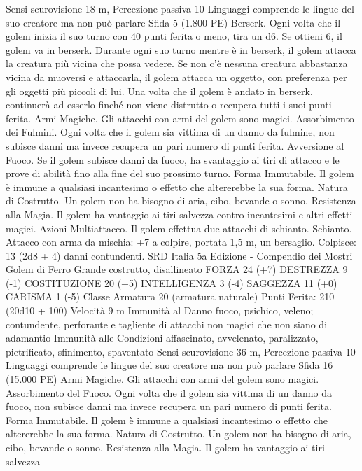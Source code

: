 \begin{multicols}{2}
Sensi scurovisione 18 m, Percezione passiva 10
Linguaggi comprende le lingue del suo creatore ma non può
parlare
Sfida 5 (1.800 PE)
Berserk. Ogni volta che il golem inizia il suo turno con 40 punti
ferita o meno, tira un d6. Se ottieni 6, il golem va in berserk.
Durante ogni suo turno mentre è in berserk, il golem attacca la
creatura più vicina che possa vedere. Se non c’è nessuna creatura
abbastanza vicina da muoversi e attaccarla, il golem attacca un
oggetto, con preferenza per gli oggetti più piccoli di lui. Una
volta che il golem è andato in berserk, continuerà ad esserlo
finché non viene distrutto o recupera tutti i suoi punti ferita.
Armi Magiche. Gli attacchi con armi del golem sono magici.
Assorbimento dei Fulmini. Ogni volta che il golem sia vittima di
un danno da fulmine, non subisce danni ma invece recupera un
pari numero di punti ferita.
Avversione al Fuoco. Se il golem subisce danni da fuoco, ha
svantaggio ai tiri di attacco e le prove di abilità fino alla fine del
suo prossimo turno.
Forma Immutabile. Il golem è immune a qualsiasi incantesimo o
effetto che altererebbe la sua forma.
Natura di Costrutto. Un golem non ha bisogno di aria, cibo,
bevande o sonno.
Resistenza alla Magia. Il golem ha vantaggio ai tiri salvezza
contro incantesimi e altri effetti magici.
Azioni
Multiattacco. Il golem effettua due attacchi di schianto.
Schianto. Attacco con arma da mischia: +7 a colpire, portata 1,5
m, un bersaglio.
Colpisce: 13 (2d8 + 4) danni contundenti.
SRD Italia 5a Edizione - Compendio dei Mostri
Golem di Ferro
Grande costrutto, disallineato
FORZA 24 (+7)
DESTREZZA 9 (-1)
COSTITUZIONE 20 (+5)
INTELLIGENZA 3 (-4)
SAGGEZZA 11 (+0)
CARISMA 1 (-5)
Classe Armatura 20 (armatura naturale)
\hspace*{0pt}\hfill{Punti Ferita}: 210 (20d10 + 100)
Velocità 9 m
Immunità al Danno fuoco, psichico, veleno; contundente,
perforante e tagliente di attacchi non magici che non siano di
adamantio
Immunità alle Condizioni affascinato, avvelenato, paralizzato,
pietrificato, sfinimento, spaventato
Sensi scurovisione 36 m, Percezione passiva 10
Linguaggi comprende le lingue del suo creatore ma non può
parlare
Sfida 16 (15.000 PE)
Armi Magiche. Gli attacchi con armi del golem sono magici.
Assorbimento del Fuoco. Ogni volta che il golem sia vittima di
un danno da fuoco, non subisce danni ma invece recupera un pari
numero di punti ferita.
Forma Immutabile. Il golem è immune a qualsiasi incantesimo o
effetto che altererebbe la sua forma.
Natura di Costrutto. Un golem non ha bisogno di aria, cibo,
bevande o sonno.
Resistenza alla Magia. Il golem ha vantaggio ai tiri salvezza

\end{multicols}
